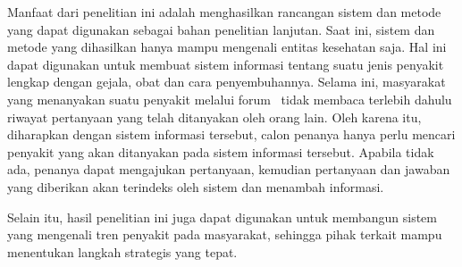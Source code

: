 Manfaat dari penelitian ini adalah menghasilkan rancangan sistem dan metode yang dapat digunakan sebagai bahan penelitian lanjutan. Saat ini, sistem dan metode yang dihasilkan hanya mampu mengenali entitas kesehatan saja. Hal ini dapat digunakan untuk membuat sistem informasi tentang suatu jenis penyakit lengkap dengan gejala, obat dan cara penyembuhannya. Selama ini, masyarakat yang menanyakan suatu penyakit melalui forum \ol~tidak membaca terlebih dahulu riwayat pertanyaan yang telah ditanyakan oleh orang lain. Oleh karena itu, diharapkan dengan sistem informasi tersebut, calon penanya hanya perlu mencari penyakit yang akan ditanyakan pada sistem informasi tersebut. Apabila tidak ada, penanya dapat mengajukan pertanyaan, kemudian pertanyaan dan jawaban yang diberikan akan terindeks oleh sistem dan menambah informasi. 

Selain itu, hasil penelitian ini juga dapat digunakan untuk membangun sistem yang mengenali tren penyakit pada masyarakat, sehingga pihak terkait mampu menentukan langkah strategis yang tepat.

